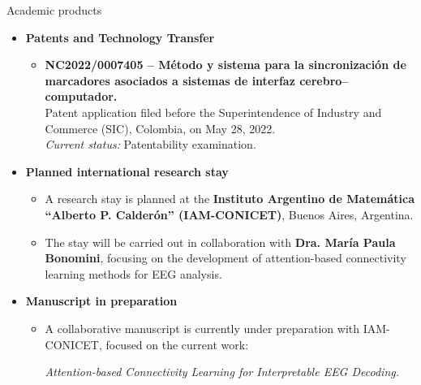 \documentclass[aspectratio=169]{beamer}
\begin{document}
\begin{frame}{Academic products}
\begin{itemize}

  \item \textbf{Patents and Technology Transfer}
  \begin{itemize}\itemsep3pt
    \item \textbf{NC2022/0007405 -- Método y sistema para la sincronización de marcadores asociados a sistemas de interfaz cerebro--computador.}\\
    Patent application filed before the Superintendence of Industry and Commerce (SIC), Colombia, on May 28, 2022.\\
    \textit{Current status:} Patentability examination.
  \end{itemize}

  \vspace{0.12cm}

  \item \textbf{Planned international research stay}
  \begin{itemize}\itemsep3pt
    \item A research stay is planned at the 
    \textbf{Instituto Argentino de Matemática ``Alberto P. Calderón'' 
    (IAM-CONICET)}, Buenos Aires, Argentina.
    
    \item The stay will be carried out in collaboration with 
    \textbf{Dra. María Paula Bonomini}, focusing on the development of 
    attention-based connectivity learning methods for EEG analysis.
  \end{itemize}

  \vspace{0.12cm}

  \item \textbf{Manuscript in preparation}
  \begin{itemize}\itemsep3pt
    \item A collaborative manuscript is currently under preparation with 
    IAM-CONICET, focused on the current work:
    
    \emph{Attention-based Connectivity Learning for Interpretable EEG Decoding.}
    
  \end{itemize}

\end{itemize}
\end{frame}
\end{document}
